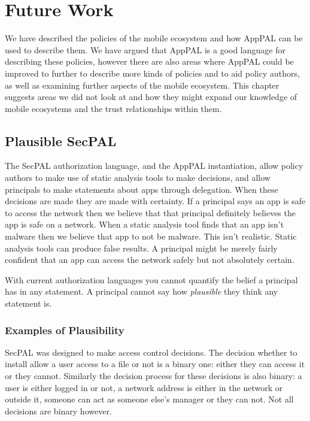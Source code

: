 \documentclass[thesis.tex]{subfiles}
\begin{document}
\chapter{Future Work}
\label{chap:future-work}

We have described the policies of the mobile ecosystem and how AppPAL can be
used to describe them. We have argued that AppPAL is a good language for
describing these policies, however there are also areas where AppPAL could be
improved to further to describe more kinds of policies and to aid policy
authors, as well as examining further aspects of the mobile ecosystem. This
chapter suggests areas we did not look at and how they might expand our
knowledge of mobile ecosystems and the trust relationships within them.

\section{Plausible SecPAL}

The SecPAL authorization language, and the AppPAL instantiation, allow policy
authors to make use of static analysis tools to make decisions, and allow
principals to make statements about apps through delegation. When these
decisions are made they are made with certainty. If a principal says an app is
safe to access the network then we believe that that principal definitely
believes the app is safe on a network. When a static analysis tool finds that an
app isn't malware then we believe that app to not be malware. This isn't
realistic. Static analysis tools can produce false results. A principal might be
merely fairly confident that an app can access the network safely but not
absolutely certain.

With current authorization languages you cannot quantify the belief a principal
has in any statement. A principal cannot say how \emph{plausible} they think any
statement is.

\subsection{Examples of Plausibility}

SecPAL was designed to make access control decisions. The decision whether to
install allow a user access to a file or not is a binary one: either they can
access it or they cannot. Similarly the decision process for these decisions is
also binary: a user is either logged in or not, a network address is either in
the network or outside it, someone can act as someone else's manager or they can
not. Not all decisions are binary however.
\end{document}
